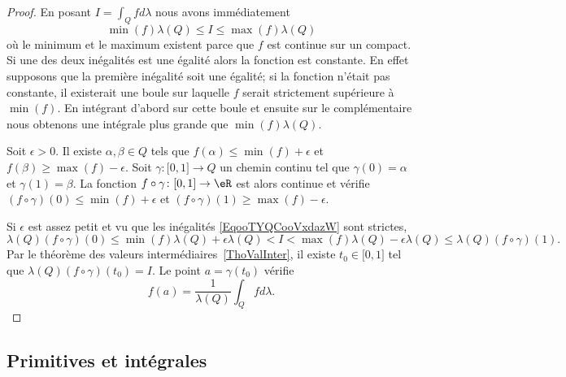 \begin{proof}
    En posant \( I=\int_Qfd\lambda\) nous avons immédiatement
    \begin{equation}        \label{EqooTYQCooVxdazW}
        \min(f)\lambda(Q)\leq I\leq \max(f)\lambda(Q)
    \end{equation}
    où le minimum et le maximum existent parce que \( f\) est continue sur un compact. Si une des deux inégalités est une égalité alors la fonction est constante. En effet supposons que la première inégalité soit une égalité; si la fonction n'était pas constante, il existerait une boule sur laquelle \( f\) serait strictement supérieure à \( \min(f)\). En intégrant d'abord sur cette boule et ensuite sur le complémentaire nous obtenons une intégrale plus grande que \( \min(f)\lambda(Q)\).

    Soit \( \epsilon>0\). Il existe \( \alpha,\beta\in Q\) tels que \( f(\alpha)\leq\min(f)+\epsilon\) et \( f(\beta)\geq\max(f)-\epsilon\). Soit \( \gamma\colon \mathopen[ 0 , 1 \mathclose]\to Q\) un chemin continu tel que \( \gamma(0)=\alpha\) et \( \gamma(1)=\beta\). La fonction \( f\circ \gamma\colon \mathopen[ 0 , 1 \mathclose]\to \eR\) est alors continue et vérifie \( (f\circ\gamma)(0)\leq \min(f)+\epsilon\) et \( (f\circ\gamma)(1)\geq \max(f)-\epsilon\).

    Si \( \epsilon\) est assez petit et vu que les inégalités \eqref{EqooTYQCooVxdazW} sont strictes,
    \begin{equation}
        \lambda(Q)(f\circ\gamma)(0)\leq \min(f)\lambda(Q)+\epsilon\lambda(Q)<I<\max(f)\lambda(Q)-\epsilon\lambda(Q)\leq\lambda(Q)(f\circ \gamma)(1).
    \end{equation}
    Par le théorème des valeurs intermédiaires~\ref{ThoValInter}, il existe \( t_0\in\mathopen[ 0 , 1 \mathclose]\) tel que \( \lambda(Q)(f\circ\gamma)(t_0)=I\). Le point \( a=\gamma(t_0)\) vérifie
    \begin{equation}
        f(a)=\frac{1}{ \lambda(Q) }\int_Qfd\lambda.
    \end{equation}
\end{proof}

\subsection{Primitives et intégrales}

